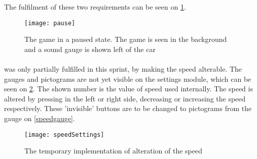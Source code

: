 The fulfilment of these two requirements can be seen on \cref{pausedstate}.

\begin{figure}
\texttt{[image: pause]}	
\caption{The game in a paused state. The game is seen in the background and a sound gauge is shown left of the car}
\label{pausedstate}
\end{figure}


\paragraph{} was only partially fulfilled in this sprint, by making the speed alterable. 
The gauges and pictograms are not yet visible on the settings module, which can be seen on \cref{speedsettings}.
The shown number is the value of speed used internally.
The speed is altered by pressing in the left or right side, decreasing or increasing the speed respectively.
These 'invisible' buttons are to be changed to pictograms from the gauge on \cref{speedgauge}.

\begin{figure}
\texttt{[image: speedSettings]}
\caption{The temporary implementation of alteration of the speed}
\label{speedsettings}
\end{figure}



